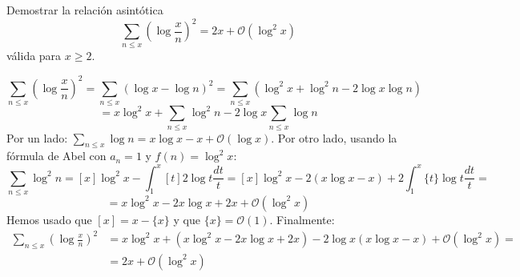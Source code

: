 \documentclass[twoside]{article}
\providecommand{\bo}[1]{\mathcal{O}\left(#1\right)}
\begin{document}
\begin{solucion}
\begin{enumerate}[(a)]
\newpage

\begin{ejercicio}{3}
Demostrar la relación asintótica
\[ \sum_{n≤x} \left(\log \frac{x}{n}\right)^2 = 2x + \bo{\log^2 x} \]
válida para $x ≥ 2$.
\end{ejercicio}
\begin{solucion}
\[ \sum_{n≤x} \left(\log \frac{x}{n}\right)^2 = \sum_{n≤x} \left(\log x - \log n\right)^2 = \sum_{n≤x} \left(\log^2 x + \log^2 n-2 \log x \log n\right)\]
\[ = x \log^2 x + \sum_{n≤x} \log^2 n - 2 \log x \sum_{n≤x} \log n\]
Por un lado: $\sum_{n≤x} \log n = x \log x - x + \mathcal{O}(\log x)$. Por otro lado, usando la fórmula de Abel con $a_n=1$ y $f(n)=\log^2 x$:
\[ \sum_{n≤x} \log^2 n = [x]\log^2 x - \int_1^x [t] 2 \log t \frac{dt}{t} = [x] \log^2 x - 2 (x \log x - x) + 2\int_1^x \{t\}\log t \frac{dt}{t} = \]
\[ = x \log^2 x -2x \log x +2x + \bo{\log^2 x} \]
Hemos usado que $[x]=x-\{x\}$ y que $\{x\}=\bo{1}$. Finalmente:
\begin{align*}
	\sum_{n≤x} \left(\log \frac{x}{n}\right)^2 & = x \log^2 x + ( x \log^2 x -2x \log x +2x) - 2 \log x (x \log x - x) + \bo{\log^2 x} =\\
	& = 2x + \bo{\log^2 x}
\end{align*}
\end{solucion}
\end{enumerate}
\end{solucion}
\end{document}
